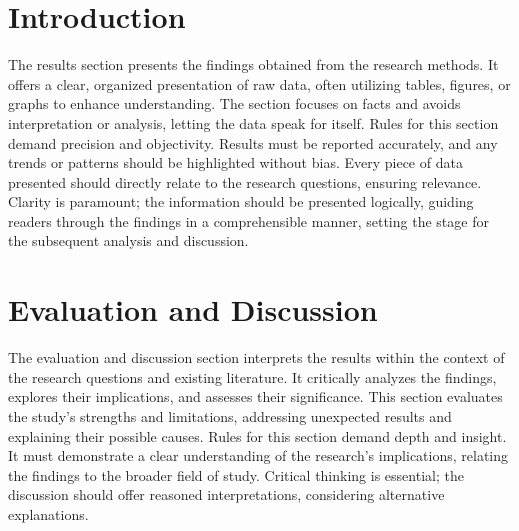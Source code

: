 % 
\section{Introduction}
\label{results:introduction}
% 
The results section presents the findings obtained from the research methods. It offers a clear, organized presentation of raw data, often utilizing tables, figures, or graphs to enhance understanding. The section focuses on facts and avoids interpretation or analysis, letting the data speak for itself. Rules for this section demand precision and objectivity. Results must be reported accurately, and any trends or patterns should be highlighted without bias. Every piece of data presented should directly relate to the research questions, ensuring relevance. Clarity is paramount; the information should be presented logically, guiding readers through the findings in a comprehensible manner, setting the stage for the subsequent analysis and discussion.


% 
\section{Evaluation and Discussion}
\label{results:evaluation}
% 
The evaluation and discussion section interprets the results within the context of the research questions and existing literature. It critically analyzes the findings, explores their implications, and assesses their significance. This section evaluates the study's strengths and limitations, addressing unexpected results and explaining their possible causes. Rules for this section demand depth and insight. It must demonstrate a clear understanding of the research's implications, relating the findings to the broader field of study. Critical thinking is essential; the discussion should offer reasoned interpretations, considering alternative explanations.

